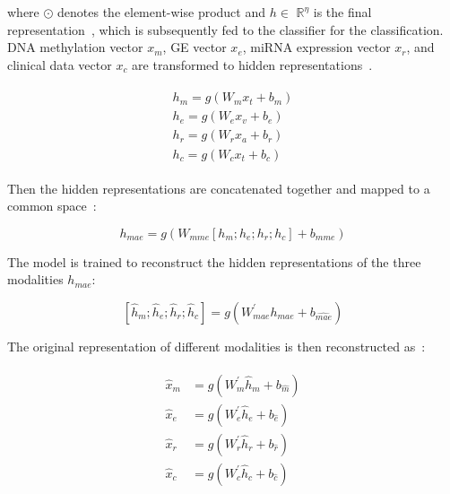 \hspace*{3.5mm} where $\odot$ denotes the element-wise product and $h \in$ $\mathbb{R}^{\eta}$ is the final representation~\cite{mmdcae}, which is subsequently fed to the classifier for the classification. DNA methylation vector  $x_m$, GE vector $x_e$, miRNA expression vector $x_r$, and clinical data vector $x_c$ are transformed to hidden representations~\cite{wang2018associativemulti}.

\vspace{-4mm}
\begin{align}
    \begin{array}{l}
        {h_{m}=g\left(W_{m} x_{t}+b_{m}\right)} \\
        {h_{e}=g\left(W_{e} x_{v}+b_{e}\right)} \\
        {h_{r}=g\left(W_{r} x_{a}+b_{r}\right)} \\
        {h_{c}=g\left(W_{c} x_{t}+b_{c}\right)}
    \end{array}
    \label{eq:m1}
\end{align}  

Then the hidden representations are concatenated together and mapped to a common space~\cite{liu2016multimodal}:

\vspace{-4mm}
\begin{equation}
    h_{mae}=g\left(W_{mme}\left[h_{m} ; h_{e} ; h_{r} ; h_{c}\right]+b_{mme}\right)
\end{equation}

The model is trained to reconstruct the hidden representations of the three modalities $h_{mae}$:

\vspace{-4mm}
\begin{equation}
    \left[\hat{h}_{m} ; \hat{h}_{e} ; \hat{h}_{r} ; \hat{h}_{c} \right]=g\left(W_{mae}^{\prime} h_{mae}+b_{\hat{mae}}\right)
\end{equation}

The original representation of different modalities is then reconstructed as~\cite{wang2018associativemulti}: 

\vspace{-4mm}
\begin{align}
    \begin{aligned}
        \hat{x}_{m} &=g\left(W_{m}^{\prime} \hat{h}_{m}+b_{\hat{m}}\right) \\
        \hat{x}_{e} &=g\left(W_{e}^{\prime} \hat{h}_{e}+b_{\hat{e}}\right) \\
        \hat{x}_{r} &=g\left(W_{r}^{\prime} \hat{h}_{r}+b_{\hat{r}}\right) \\
        \hat{x}_{c} &=g\left(W_{c}^{\prime} \hat{h}_{c}+b_{\hat{c}}\right)
        \end{aligned}
\end{align}

